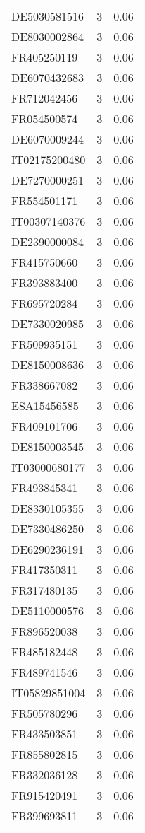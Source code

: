 \begin{table*}[htbp]
\begin{tabular}{lrr}
DE5030581516 & 3 & 0.06 \\
DE8030002864 & 3 & 0.06 \\
FR405250119 & 3 & 0.06 \\
DE6070432683 & 3 & 0.06 \\
FR712042456 & 3 & 0.06 \\
FR054500574 & 3 & 0.06 \\
DE6070009244 & 3 & 0.06 \\
IT02175200480 & 3 & 0.06 \\
DE7270000251 & 3 & 0.06 \\
FR554501171 & 3 & 0.06 \\
IT00307140376 & 3 & 0.06 \\
DE2390000084 & 3 & 0.06 \\
FR415750660 & 3 & 0.06 \\
FR393883400 & 3 & 0.06 \\
FR695720284 & 3 & 0.06 \\
DE7330020985 & 3 & 0.06 \\
FR509935151 & 3 & 0.06 \\
DE8150008636 & 3 & 0.06 \\
FR338667082 & 3 & 0.06 \\
ESA15456585 & 3 & 0.06 \\
FR409101706 & 3 & 0.06 \\
DE8150003545 & 3 & 0.06 \\
IT03000680177 & 3 & 0.06 \\
FR493845341 & 3 & 0.06 \\
DE8330105355 & 3 & 0.06 \\
DE7330486250 & 3 & 0.06 \\
DE6290236191 & 3 & 0.06 \\
FR417350311 & 3 & 0.06 \\
FR317480135 & 3 & 0.06 \\
DE5110000576 & 3 & 0.06 \\
FR896520038 & 3 & 0.06 \\
FR485182448 & 3 & 0.06 \\
FR489741546 & 3 & 0.06 \\
IT05829851004 & 3 & 0.06 \\
FR505780296 & 3 & 0.06 \\
FR433503851 & 3 & 0.06 \\
FR855802815 & 3 & 0.06 \\
FR332036128 & 3 & 0.06 \\
FR915420491 & 3 & 0.06 \\
FR399693811 & 3 & 0.06 \\

\end{tabular}
\end{table*}
